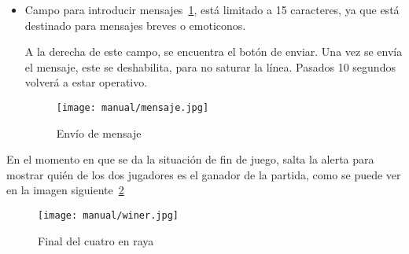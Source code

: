 \begin{itemize}
	\item Campo para introducir mensajes~\ref{fig:mensaje}, está limitado a 15 caracteres, ya que está destinado para mensajes breves o emoticonos.
	
	A la derecha de este campo, se encuentra el botón de enviar. Una vez se envía el mensaje, este se deshabilita, para no saturar la línea. Pasados 10 segundos volverá a estar operativo.
	
	\begin{figure}[H]
		\centering
		\texttt{[image: manual/mensaje.jpg]}
		\caption{Envío de mensaje}\label{fig:mensaje}
	\end{figure}
\end{itemize}

En el momento en que se da la situación de fin de juego, salta la alerta para mostrar quién de los dos jugadores es el ganador de la partida, como se puede ver en la imagen siguiente~\ref{fig:finalcuatro}

\begin{figure}[H]
	\centering
	\texttt{[image: manual/winer.jpg]}
	\caption{Final del cuatro en raya}\label{fig:finalcuatro}
\end{figure} 